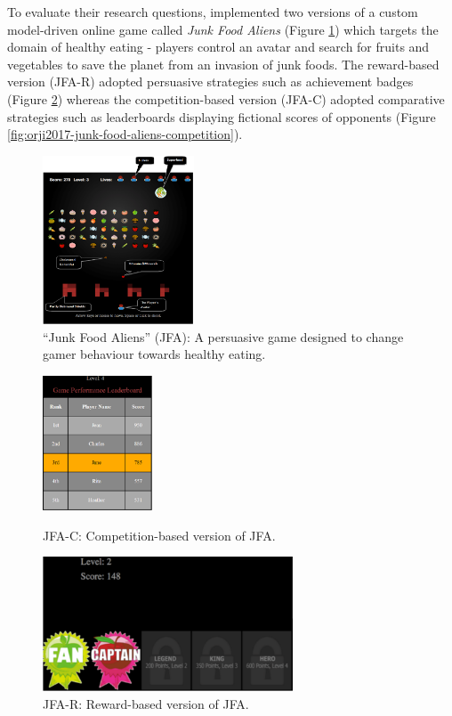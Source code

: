 \documentclass[11pt]{article}
\begin{document}
To evaluate their research questions, \citeauthor{orji2017} implemented two versions of a custom model-driven online game called \textit{Junk Food Aliens} (Figure \ref{fig:orji2017-junk-food-aliens}) which targets the domain of healthy eating - players control an avatar and search for fruits and vegetables to save the planet from an invasion of junk foods. The reward-based version (JFA-R) adopted persuasive strategies such as achievement badges (Figure \ref{fig:orji2017-junk-food-aliens-reward}) whereas the competition-based version (JFA-C) adopted comparative strategies such as leaderboards displaying fictional scores of opponents (Figure \ref{fig:orji2017-junk-food-aliens-competition}). 

\begin{figure}[H]
\centering
\includegraphics[width=0.4\textwidth]{img/orji2017-junk-food-aliens.png} 
\caption{``Junk Food Aliens'' (JFA): A persuasive game designed to change gamer behaviour towards healthy eating.}\label{fig:orji2017-junk-food-aliens}
\end{figure}

\begin{figure}[H]
\centering
  \includegraphics[height=4cm]{img/orji2017-junk-food-aliens-competition.png}
  \caption{JFA-C: Competition-based version of JFA.}\label{fig:orji2017-junk-food-aliens-competition}
\endminipage\hfill
{}%
\centering
  \includegraphics[height=4cm]{img/orji2017-junk-food-aliens-reward.png}
  \caption{JFA-R: Reward-based version of JFA.}\label{fig:orji2017-junk-food-aliens-reward}
\endminipage
\end{figure}
\end{document}
